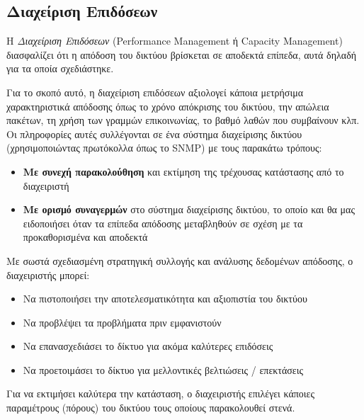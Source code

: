 %
%
\subsection{Διαχείριση Επιδόσεων}

\begin{inthebox}
Η \emph{Διαχείριση Επιδόσεων} (Performance Management ή Capacity Management) διασφαλίζει ότι η απόδοση του δικτύου βρίσκεται σε αποδεκτά επίπεδα, αυτά δηλαδή για τα οποία σχεδιάστηκε.\\
\end{inthebox}

Για το σκοπό αυτό, η διαχείριση επιδόσεων αξιολογεί κάποια μετρήσιμα χαρακτηριστικά απόδοσης όπως το χρόνο απόκρισης του δικτύου, την απώλεια πακέτων, τη χρήση των γραμμών επικοινωνίας, το βαθμό λαθών που συμβαίνουν κλπ. Οι πληροφορίες αυτές συλλέγονται σε ένα σύστημα διαχείρισης δικτύου (χρησιμοποιώντας πρωτόκολλα όπως το SNMP) με τους παρακάτω τρόπους:

\begin{itemize}
\item \textbf{Με συνεχή παρακολούθηση} και εκτίμηση της τρέχουσας κατάστασης από το διαχειριστή
\item \textbf{Με ορισμό συναγερμών} στο σύστημα διαχείρισης δικτύου, το οποίο και θα μας ειδοποιήσει όταν τα επίπεδα απόδοσης μεταβληθούν σε σχέση με τα προκαθορισμένα και αποδεκτά
\end{itemize}

Με σωστά σχεδιασμένη στρατηγική συλλογής και ανάλυσης δεδομένων απόδοσης, ο διαχειριστής μπορεί:

\begin{itemize}
\item Να πιστοποιήσει την αποτελεσματικότητα και αξιοπιστία του δικτύου
\item Να προβλέψει τα προβλήματα πριν εμφανιστούν
\item Να επανασχεδιάσει το δίκτυο για ακόμα καλύτερες επιδόσεις
\item Να προετοιμάσει το δίκτυο για μελλοντικές βελτιώσεις / επεκτάσεις
\end{itemize}

Για να εκτιμήσει καλύτερα την κατάσταση, ο διαχειριστής επιλέγει κάποιες παραμέτρους (πόρους) του δικτύου τους οποίους παρακολουθεί στενά.
